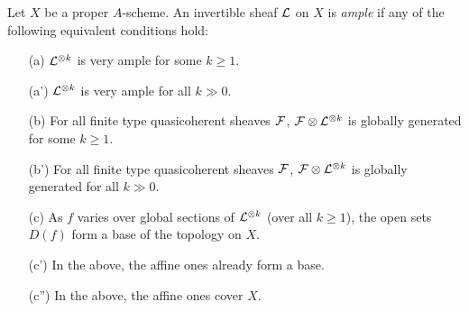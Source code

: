 \documentclass[11pt]{amsart}
\begin{document}
\begin{defn}
    Let $X$ be a proper $A$-scheme. An invertible sheaf $\mathcal{L}$ on $X$ is \emph{ample} if any of the following equivalent conditions hold:
    \begin{itemize}
        \item[(a)] $\mathcal{L}^{\otimes k}$ is very ample for some $k\ge 1$.
        \item[(a')] $\mathcal{L}^{\otimes k}$ is very ample for all $k \gg 0$.
        \item[(b)] For all finite type quasicoherent sheaves $\mathcal{F}$, $\mathcal{F}\otimes \mathcal{L}^{\otimes k}$ is globally generated for some $k\ge 1$.
        \item[(b')] For all finite type quasicoherent sheaves $\mathcal{F}$, $\mathcal{F}\otimes \mathcal{L}^{\otimes k}$ is globally generated for all $k\gg 0$.
        \item[(c)] As $f$ varies over global sections of $\mathcal{L}^{\otimes k}$ (over all $k\ge 1$), the open sets $D(f)$ form a base of the topology on $X$.
        \item[(c')] In the above, the affine ones already form a base.
        \item[(c'')] In the above, the affine ones cover $X$.
    \end{itemize}
\end{defn}
\end{document}
